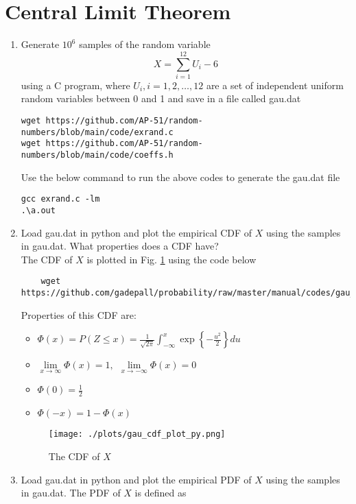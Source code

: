 \documentclass[journal,12pt,twocolumn]{IEEEtran}
\renewcommand\thesection{\arabic{section}}
\begin{document}
\section{Central Limit Theorem}
%
\begin{enumerate}[label=\thesection.\arabic*
,ref=\thesection.\theenumi]
%
\item
Generate $10^6$ samples of the random variable
%
\begin{equation}
X = \sum_{i=1}^{12}U_i -6
\end{equation}
%
using a C program, where $U_i, i = 1,2,\dots, 12$ are  a set of independent uniform random variables between 0 and 1
and save in a file called gau.dat
\solution
\begin{lstlisting}
wget https://github.com/AP-51/random-numbers/blob/main/code/exrand.c
wget https://github.com/AP-51/random-numbers/blob/main/code/coeffs.h
\end{lstlisting}
Use the below command to run the above codes to generate the gau.dat file
\begin{lstlisting}
gcc exrand.c -lm
.\a.out
\end{lstlisting}
\item
Load gau.dat in python and plot the empirical CDF of $X$ using the samples in gau.dat. What properties does a CDF have?\\
\solution The CDF of $X$ is plotted in Fig. \ref{fig:gauss_cdf} using the code below
\begin{lstlisting}
    wget https://github.com/gadepall/probability/raw/master/manual/codes/gau_cdf_plot.py
    \end{lstlisting}
Properties of this CDF are:
\begin{itemize}
    \item $\Phi(x)=P(Z \leq x)= \frac{1}{\sqrt{2 \pi}} \int_{-\infty}^{x}\exp\left\{-\frac{u^2}{2}\right\} du$
    \item $\lim \limits_{x\rightarrow \infty} \Phi(x)=1, \hspace{5pt} \lim \limits_{x\rightarrow -\infty} \Phi(x)=0$
    \item  $\Phi(0)=\frac{1}{2}$
    \item  $\Phi(-x)=1-\Phi(x)$
    \end{itemize}
\begin{figure}[h]
\centering
\texttt{[image: ./plots/gau\_cdf\_plot\_py.png]}
\caption{The CDF of $X$}
\label{fig:gauss_cdf}
\end{figure}
\item
Load gau.dat in python and plot the empirical PDF of $X$ using the samples in gau.dat. The PDF of $X$ is defined as

\end{enumerate}
\end{document}
